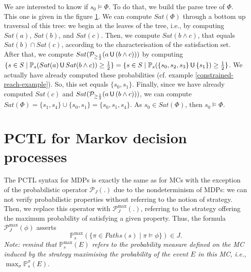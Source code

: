 \begin{example}
\begin{figure}[h!]
\begin{minipage}{0.6\linewidth}
    \captionsetup{justification=centering}
    \label{parse-tree-example}
  \end{minipage}
  \end{figure}
  We are interested to know if $s_0 \models \Phi$. To do that, we build the parse tree of $\Phi$.
  This one is given in the figure \ref{parse-tree-example}. We can compute $Sat(\Phi)$ through a bottom up traversal of this tree: we begin at the leaves of the tree, i.e., by computing $Sat(a)$, $Sat(b)$, and $Sat(c)$. Then, we compute $Sat(b \wedge c)$, that equals $Sat(b)\cap Sat(c)$, according to the characterisation of the satisfaction set.
  After that, we compute
  $Sat(\mathcal{P}_{\geq \frac{1}{2}}(a \,\text{\sffamily U}\, (b \wedge c)))$ by computing $\{ s \in S \; | \; \mathbb{P}_s(Sat(a) \,\text{\sffamily U}\, Sat(b \wedge c)) \geq \frac{1}{2}\} = \{ s \in S \; | \; \mathbb{P}_s(\{s_0, s_2, s_3\} \,\text{\sffamily U}\, \{s_1\}) \geq \frac{1}{2}\}$.
  We actually have already computed these probabilities (cf. example \ref{constrained-reach-example}).
  So, this set equals $\{ s_0, s_1 \}$.
  Finally, since we have already computed $Sat(c)$ and $Sat(\mathcal{P}_{\geq \frac{1}{2}}(a \,\text{\sffamily U}\, (b \wedge c)))$, we can compute $Sat(\Phi) = \{s_1, s_4\} \cup \{s_0, s_1\} = \{s_0, s_1, s_4\}$.
  As $s_0 \in Sat(\Phi)$, then $s_0 \models \Phi$.
\end{example}

\section{PCTL for Markov decision processes}
The PCTL syntax for MDPs is exactly the same as for MCs with the exception of the probabilistic operator $\mathcal{P}_J(.)$ due to the nondeterminism of MDPs:
we can not verify probabilistic properties without referring to the notion of strategy.
Then, we replace this operator with $\mathcal{P}^{\max}_J(.)$, referring to the strategy offering the maximum probability of satisfying a given property.
Thus, the formula $\mathcal{P}^{\max}_J(\phi)$ asserts \[\mathbb{P}^{\max}_s(\{\pi \in Paths(s) \; | \; \pi \models \phi \}) \in J .\]
\textit{Note: remind that $\mathbb{P}_s^{\max}(E)$ refers to the probability measure defined on the MC induced by the strategy maximising the probability of the event $E$ in this MC, i.e., $\max_{\sigma} \mathbb{P}_s^\sigma(E)$.}

